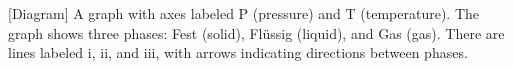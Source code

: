 [Diagram] A graph with axes labeled P (pressure) and T (temperature). The graph shows three phases: Fest (solid), Flüssig (liquid), and Gas (gas). There are lines labeled i, ii, and iii, with arrows indicating directions between phases.